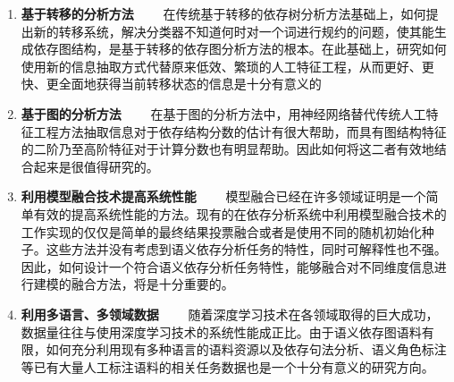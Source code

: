 \begin{enumerate}
\item \textbf{基于转移的分析方法}
\ \ \ \ 在传统基于转移的依存树分析方法基础上，如何提出新的转移系统，解决分类器不知道何时对一个词进行规约的问题，使其能生成依存图结构，是基于转移的依存图分析方法的根本。在此基础上，研究如何使用新的信息抽取方式代替原来低效、繁琐的人工特征工程，从而更好、更快、更全面地获得当前转移状态的信息是十分有意义的
	
\item \textbf{基于图的分析方法}
\ \ \ \ 在基于图的分析方法中，用神经网络替代传统人工特征工程方法抽取信息对于依存结构分数的估计有很大帮助，而具有图结构特征的二阶乃至高阶特征对于计算分数也有明显帮助。因此如何将这二者有效地结合起来是很值得研究的。

	
\item \textbf{利用模型融合技术提高系统性能}
\ \ \ \ 模型融合已经在许多领域证明是一个简单有效的提高系统性能的方法。现有的在依存分析系统中利用模型融合技术的工作实现的仅仅是简单的最终结果投票融合或者是使用不同的随机初始化种子。这些方法并没有考虑到语义依存分析任务的特性，同时可解释性也不强。因此，如何设计一个符合语义依存分析任务特性，能够融合对不同维度信息进行建模的融合方法，将是十分重要的。
	
\item \textbf{利用多语言、多领域数据}
\ \ \ \ 随着深度学习技术在各领域取得的巨大成功，数据量往往与使用深度学习技术的系统性能成正比。由于语义依存图语料有限，如何充分利用现有多种语言的语料资源以及依存句法分析、语义角色标注等已有大量人工标注语料的相关任务数据也是一个十分有意义的研究方向。
	
\end{enumerate}




